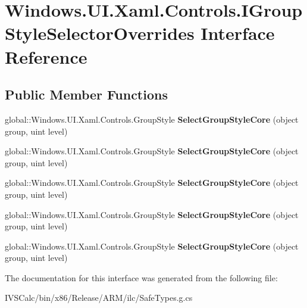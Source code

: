 \hypertarget{interface_windows_1_1_u_i_1_1_xaml_1_1_controls_1_1_i_group_style_selector_overrides}{}\section{Windows.\+U\+I.\+Xaml.\+Controls.\+I\+Group\+Style\+Selector\+Overrides Interface Reference}
\label{interface_windows_1_1_u_i_1_1_xaml_1_1_controls_1_1_i_group_style_selector_overrides}
\subsection*{Public Member Functions}
\begin{DoxyCompactItemize}
\item 
\mbox{\label{interface_windows_1_1_u_i_1_1_xaml_1_1_controls_1_1_i_group_style_selector_overrides_ab71283a682a0a27c3f8873f7ba76cfee}} 
global\+::\+Windows.\+U\+I.\+Xaml.\+Controls.\+Group\+Style {\bfseries Select\+Group\+Style\+Core} (object group, uint level)
\item 
\mbox{\label{interface_windows_1_1_u_i_1_1_xaml_1_1_controls_1_1_i_group_style_selector_overrides_ab71283a682a0a27c3f8873f7ba76cfee}} 
global\+::\+Windows.\+U\+I.\+Xaml.\+Controls.\+Group\+Style {\bfseries Select\+Group\+Style\+Core} (object group, uint level)
\item 
\mbox{\label{interface_windows_1_1_u_i_1_1_xaml_1_1_controls_1_1_i_group_style_selector_overrides_ab71283a682a0a27c3f8873f7ba76cfee}} 
global\+::\+Windows.\+U\+I.\+Xaml.\+Controls.\+Group\+Style {\bfseries Select\+Group\+Style\+Core} (object group, uint level)
\item 
\mbox{\label{interface_windows_1_1_u_i_1_1_xaml_1_1_controls_1_1_i_group_style_selector_overrides_ab71283a682a0a27c3f8873f7ba76cfee}} 
global\+::\+Windows.\+U\+I.\+Xaml.\+Controls.\+Group\+Style {\bfseries Select\+Group\+Style\+Core} (object group, uint level)
\item 
\mbox{\label{interface_windows_1_1_u_i_1_1_xaml_1_1_controls_1_1_i_group_style_selector_overrides_ab71283a682a0a27c3f8873f7ba76cfee}} 
global\+::\+Windows.\+U\+I.\+Xaml.\+Controls.\+Group\+Style {\bfseries Select\+Group\+Style\+Core} (object group, uint level)
\end{DoxyCompactItemize}


The documentation for this interface was generated from the following file\+:\begin{DoxyCompactItemize}
\item 
I\+V\+S\+Calc/bin/x86/\+Release/\+A\+R\+M/ilc/Safe\+Types.\+g.\+cs\end{DoxyCompactItemize}
